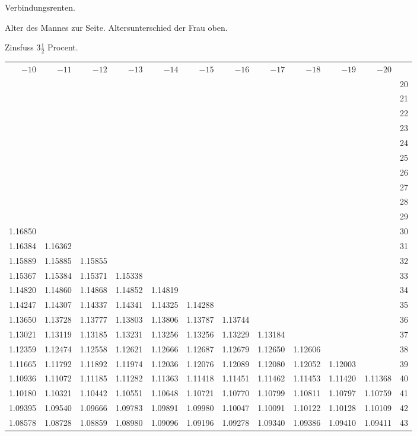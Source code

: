 \clearpage
{}
\begin{center}
Verbindungsrenten.\par\smallskip
Alter des Mannes zur Seite. Altersunterschied der Frau oben.\par\smallskip
Zinsfuss \(3\tfrac{1}{2}\) Procent.\par\medskip
\fontsize{8}{10}\selectfont\setlength{\tabcolsep}{1.3pt}
\begin{tabular}{|rrrrrrrrrrr|r|}
\hline
\(-10\)&\(-11\)&\(-12\)&\(-13\)&\(-14\)&\(-15\)&\(-16\)&\(-17\)&\(-18\)&\(-19\)&\(-20\)&\\[8pt]
&&&&&&&&&&&20\\
&&&&&&&&&&&21\\
&&&&&&&&&&&22\\
&&&&&&&&&&&23\\
&&&&&&&&&&&24\\[5pt]
&&&&&&&&&&&25\\
&&&&&&&&&&&26\\
&&&&&&&&&&&27\\
&&&&&&&&&&&28\\
&&&&&&&&&&&29\\[5pt]
1.16850&&&&&&&&&&&30\\
1.16384&1.16362&&&&&&&&&&31\\
1.15889&1.15885&1.15855&&&&&&&&&32\\
1.15367&1.15384&1.15371&1.15338&&&&&&&&33\\
1.14820&1.14860&1.14868&1.14852&1.14819&&&&&&&34\\[5pt]
1.14247&1.14307&1.14337&1.14341&1.14325&1.14288&&&&&&35\\
1.13650&1.13728&1.13777&1.13803&1.13806&1.13787&1.13744&&&&&36\\
1.13021&1.13119&1.13185&1.13231&1.13256&1.13256&1.13229&1.13184&&&&37\\
1.12359&1.12474&1.12558&1.12621&1.12666&1.12687&1.12679&1.12650&1.12606&&&38\\
1.11665&1.11792&1.11892&1.11974&1.12036&1.12076&1.12089&1.12080&1.12052&1.12003&&39\\[5pt]
1.10936&1.11072&1.11185&1.11282&1.11363&1.11418&1.11451&1.11462&1.11453&1.11420&1.11368&40\\
1.10180&1.10321&1.10442&1.10551&1.10648&1.10721&1.10770&1.10799&1.10811&1.10797&1.10759&41\\
1.09395&1.09540&1.09666&1.09783&1.09891&1.09980&1.10047&1.10091&1.10122&1.10128&1.10109&42\\
1.08578&1.08728&1.08859&1.08980&1.09096&1.09196&1.09278&1.09340&1.09386&1.09410&1.09411&43\\

\end{tabular}
\end{center}
